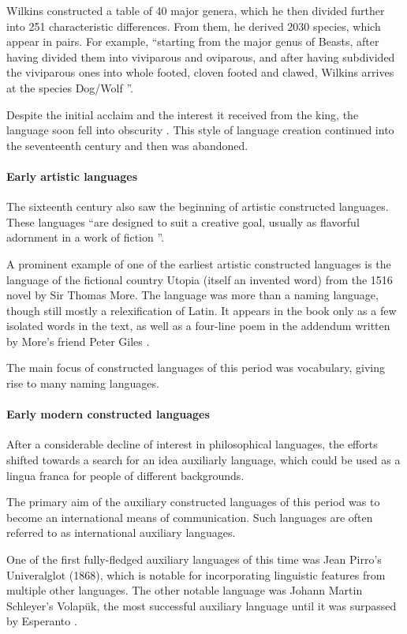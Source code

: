 \documentclass[14pt, a4paper]{extreport}
\begin{document}
Wilkins constructed a table of 40 major genera, which he then divided further into 251 characteristic differences. From them, he derived 2030 species, which appear in pairs. For example, ``starting from the major genus of Beasts, after having divided them into viviparous and oviparous, and after having subdivided the viviparous ones into whole footed, cloven footed and clawed, Wilkins arrives at the species Dog/Wolf \parencite[239]{eco}''.

Despite the initial acclaim and the interest it received from the king, the language soon fell into obscurity \parencite[25]{okrent}. This style of language creation continued into the seventeenth century and then was abandoned.
        \paragraph{Early artistic languages}
The sixteenth century also saw the beginning of artistic constructed languages. These languages ``are designed to suit a creative goal, usually as flavorful adornment in a work of fiction \parencite{sanders}''.

A prominent example of one of the earliest artistic constructed languages is the language of the fictional country Utopia (itself an invented word) from the 1516 novel by Sir Thomas More. The language was more than a naming language, though still mostly a relexification of Latin. It appears in the book only as a few isolated words in the text, as well as a four-line poem in the addendum written by More's friend Peter Giles \parencite{sanders}.

The main focus of constructed languages of this period was vocabulary, giving rise to many naming languages.
        \paragraph{Early modern constructed languages}
After a considerable decline of interest in philosophical languages, the efforts shifted towards a search for an idea auxiliarly language, which could be used as a lingua franca for people of different backgrounds.

The primary aim of the auxiliary constructed languages of this period was to become an international means of communication. Such languages are often referred to as international auxiliary languages.

One of the first fully-fledged auxiliary languages of this time was Jean Pirro's Univeralglot (1868), which is notable for incorporating linguistic features from multiple other languages. The other notable language was Johann Martin Schleyer's Volapük, the most successful auxiliary language until it was surpassed by Esperanto \parencite{sanders}.
\end{document}
